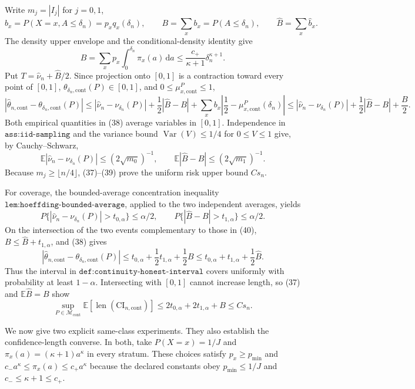 Write \(m_j=|I_j|\) for \(j=0,1\),
\[
 b_x=P(X=x,A\leq\delta_n)=p_xq_x(\delta_n),
 \qquad B=\sum_xb_x=P(A\leq\delta_n),
 \qquad \widehat B=\sum_x\widehat b_x. \tag{36}
\]
The density upper envelope and the conditional-density identity give
\[
 B=\sum_xp_x\int_0^{\delta_n}\pi_x(a)\,\mathrm da
 \leq \frac{c_+}{\kappa+1}\delta_n^{\kappa+1}. \tag{37}
\]
Put \(T=\widehat\nu_n+\widehat B/2\).  Since projection onto \([0,1]\) is a contraction toward every point of \([0,1]\), \(\theta_{\delta_n,\mathrm{cont}}(P)\in[0,1]\), and \(0\leq\mu_{x,\mathrm{cont}}^P\leq1\),
\[
 |\widehat\theta_{n,\mathrm{cont}}-\theta_{\delta_n,\mathrm{cont}}(P)|
 \leq |\widehat\nu_n-\nu_{\delta_n}(P)|
 +\frac12|\widehat B-B|
 +\sum_xb_x\left|\frac12-\mu_{x,\mathrm{cont}}^P(\delta_n)\right|
 \leq |\widehat\nu_n-\nu_{\delta_n}(P)|+\frac12|\widehat B-B|+\frac B2. \tag{38}
\]
Both empirical quantities in (38) average variables in \([0,1]\).  Independence in \(\texttt{ass:iid-sampling}\) and the variance bound \(\operatorname{Var}(V)\leq1/4\) for \(0\leq V\leq1\) give, by Cauchy--Schwarz,
\[
 \mathbb E|\widehat\nu_n-\nu_{\delta_n}(P)|\leq(2\sqrt{m_0})^{-1},
 \qquad
 \mathbb E|\widehat B-B|\leq(2\sqrt{m_1})^{-1}. \tag{39}
\]
Because \(m_j\geq\lfloor n/4\rfloor\), (37)--(39) prove the uniform risk upper bound \(Cs_n\).

For coverage, the bounded-average concentration inequality \(\texttt{lem:hoeffding-bounded-average}\), applied to the two independent averages, yields
\[
 P\{|\widehat\nu_n-\nu_{\delta_n}(P)|>t_{0,\alpha}\}\leq\alpha/2,
 \qquad
 P\{|\widehat B-B|>t_{1,\alpha}\}\leq\alpha/2. \tag{40}
\]
On the intersection of the two events complementary to those in (40), \(B\leq\widehat B+t_{1,\alpha}\), and (38) gives
\[
 |\widehat\theta_{n,\mathrm{cont}}-\theta_{\delta_n,\mathrm{cont}}(P)|
 \leq t_{0,\alpha}+\frac12t_{1,\alpha}+\frac12B
 \leq t_{0,\alpha}+t_{1,\alpha}+\frac12\widehat B. \tag{41}
\]
Thus the interval in \(\texttt{def:continuity-honest-interval}\) covers uniformly with probability at least \(1-\alpha\).  Intersecting with \([0,1]\) cannot increase length, so (37) and \(\mathbb E\widehat B=B\) show
\[
 \sup_{P\in\mathcal M_{\mathrm{cont}}}
 \mathbb E[\operatorname{len}(\mathrm{CI}_{n,\mathrm{cont}})]
 \leq2t_{0,\alpha}+2t_{1,\alpha}+B
 \leq Cs_n. \tag{42}
\]

We now give two explicit same-class experiments.  They also establish the confidence-length converse.  In both, take \(P(X=x)=1/J\) and \(\pi_x(a)=(\kappa+1)a^\kappa\) in every stratum.  These choices satisfy \(p_x\geq p_{\min}\) and \(c_-a^\kappa\leq\pi_x(a)\leq c_+a^\kappa\) because the declared constants obey \(p_{\min}\leq1/J\) and \(c_-\leq\kappa+1\leq c_+\).

